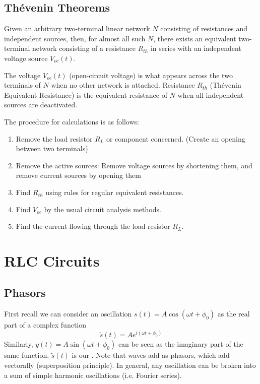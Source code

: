 \subsection{Th\'{e}venin Theorems}

\begin{thm}
    Given an arbitrary two-terminal linear network $N$ consisting of resistances and independent sources, then, for almost all such $N$, there exists an equivalent two-terminal network consisting of a resistance $R_{th}$ in series with an independent voltage source $V_{oc}(t)$.
\end{thm}

The voltage $V_{oc}(t)$ (open-circuit voltage) is what appears across the two terminals of $N$ when no other network is attached. Resistance $R_{th}$ (Th\'{e}venin Equivalent Resistance) is the equivalent resistance of $N$ when all independent sources are deactivated.

The procedure for calculations is as follows:

\begin{enumerate}
    \item Remove the load resistor $R_L$ or component concerned. (Create an opening between two terminals)
    \item Remove the active sources: Remove voltage sources by shortening them, and remove current sources by opening them
    \item Find $R_{th}$ using rules for regular equivalent resistances.
    \item Find $V_{oc}$ by the usual circuit analysis methods.
    \item Find the current flowing through the load resistor $R_L$.
\end{enumerate}


\section{RLC Circuits}

\subsection{Phasors}

First recall we can consider an oscillation $s(t) = A\cos(\omega t+\phi_0)$ as the real part of a complex function $$\tilde{s}(t) = Ae^{i(\omega t+\phi_0)}$$ Similarly, $y(t) = A\sin(\omega t+\phi_0)$ can be seen as the imaginary part of the same function. $\tilde{s}(t)$ is our . Note that waves add as phasors, which add vectorally (superposition principle). In general, any oscillation can be broken into a sum of simple harmonic oscillations (i.e. Fourier series). 


